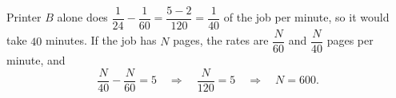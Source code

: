 Printer $B$ alone does $\dfrac{1}{24}-\dfrac{1}{60}=\dfrac{5-2}{120}=\dfrac{1}{40}$ of the job per minute, so it would take $40$ minutes. If the job has $N$ pages, the rates are $\dfrac {N}{60}$ and $\dfrac {N}{40}$ pages per minute, and
\[\dfrac {N}{40}-\dfrac {N}{60}=5\quad\Longrightarrow\quad\dfrac{N}{120}=5\quad\Longrightarrow\quad N=\boxed{600}.\]
